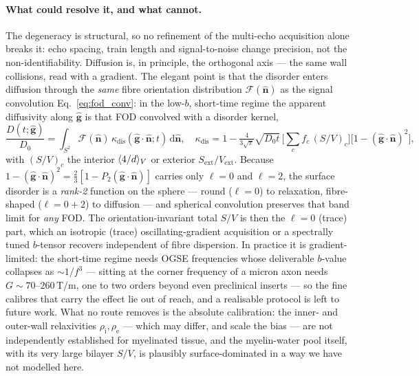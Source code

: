 \paragraph{What could resolve it, and what cannot.} The degeneracy is structural, so no
refinement of the multi-echo acquisition alone breaks it: echo spacing, train length and
signal-to-noise change precision, not the non-identifiability. Diffusion is, in
principle, the orthogonal axis --- the same wall collisions, read with a gradient. The
elegant point is that the disorder enters diffusion through the \emph{same} fibre
orientation distribution $\mathcal F(\hat{\mathbf n})$ as the signal convolution
Eq.~\eqref{eq:fod_conv}: in the low-$b$, short-time regime the apparent diffusivity along
$\hat{\mathbf g}$ is that FOD convolved with a disorder kernel,
\begin{equation}
  \frac{D(t;\hat{\mathbf g})}{D_0}=\int_{S^2}\mathcal F(\hat{\mathbf n})\,
  \kappa_{\mathrm{dis}}(\hat{\mathbf g}\!\cdot\!\hat{\mathbf n};t)\,\mathrm d\hat{\mathbf n},
  \quad
  \kappa_{\mathrm{dis}}=1-\tfrac{4}{3\sqrt\pi}\sqrt{D_0 t}\,
  \Big[\textstyle\sum_c f_c\,(S/V)_c\Big]\big[1-(\hat{\mathbf g}\!\cdot\!\hat{\mathbf n})^2\big],
  \label{eq:kdis}
\end{equation}
with $(S/V)_c$ the interior $\langle 4/d\rangle_{V}$ or exterior $S_{\mathrm{ext}}/V_{\mathrm{ext}}$. Because
$1-(\hat{\mathbf g}\!\cdot\!\hat{\mathbf n})^2=\tfrac23[1-P_2(\hat{\mathbf g}\!\cdot\!\hat{\mathbf n})]$
carries only $\ell=0$ and $\ell=2$, the surface disorder is a \emph{rank-2} function on the
sphere --- round ($\ell{=}0$) to relaxation, fibre-shaped ($\ell{=}0{+}2$) to diffusion --- and
spherical convolution preserves that band limit for \emph{any} FOD. The orientation-invariant
total $S/V$ is then the $\ell=0$ (trace) part, which an isotropic (trace) oscillating-gradient
acquisition or a spectrally tuned $b$-tensor \citep{Lundell2019, Westin2016} recovers
independent of fibre dispersion. In practice it is gradient-limited: the short-time regime needs
OGSE frequencies whose deliverable $b$-value collapses as $\sim$$1/f^3$ \citep{Does2003} ---
sitting at the corner frequency of a micron axon needs $G\!\sim\!70$--$260\,$T/m, one to two
orders beyond even preclinical inserts --- so the fine calibres that carry the effect lie out of
reach, and a realisable protocol is left to future work. What no route removes
is the absolute calibration: the inner- and outer-wall relaxivities
$\rho_{\mathrm i},\rho_{\mathrm e}$ --- which may differ, and scale the bias --- are not
independently established for myelinated tissue, and the myelin-water pool itself, with its
very large bilayer $S/V$, is plausibly surface-dominated in a way we have not modelled
here.

